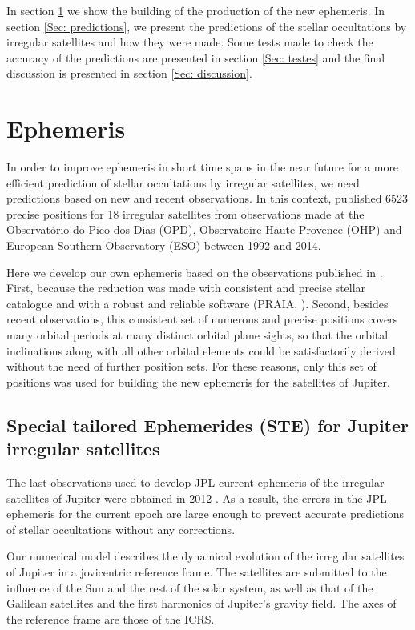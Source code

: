\documentclass[useAMS,usenatbib]{mn2e}
\begin{document}
In section \ref{Sec: integration} we show the building of the production of the new ephemeris. In section \ref{Sec: predictions}, we present the predictions of the stellar occultations by irregular satellites and how they were made. Some tests made to check the accuracy of the predictions are presented in section \ref{Sec: testes} and the final discussion is presented in section \ref{Sec: discussion}.

\section{Ephemeris} \label{Sec: integration}

In order to improve ephemeris in short time spans in the near future for a more efficient prediction of stellar occultations by irregular satellites, we need predictions based on new and recent observations. In this context, \cite{GomesJunior2015} published 6523 precise positions for 18 irregular satellites from observations made at the Observatório do Pico dos Dias (OPD), Observatoire Haute-Provence (OHP) and European Southern Observatory (ESO) between 1992 and 2014. 

Here we develop our own ephemeris based on the observations published in \cite{GomesJunior2015}. First, because the reduction was made with consistent and precise stellar catalogue and with a robust and reliable software (PRAIA, \cite{Assafin2011}). Second, besides recent observations, this consistent set of numerous and precise positions covers many orbital periods at many distinct orbital plane sights, so that the orbital inclinations along with all other orbital elements could be satisfactorily derived without the need of further position sets. For these reasons, only this set of positions was used for building the new ephemeris for the satellites of Jupiter.

\subsection{Special tailored Ephemerides (STE) for Jupiter irregular satellites}

The last observations used to develop JPL current ephemeris of the irregular satellites of Jupiter were obtained in 2012 \citep{Jacobson2012}. As a result, the errors in the JPL ephemeris for the current epoch are large enough to prevent accurate predictions of stellar occultations without any corrections.

Our numerical model describes the dynamical evolution of the irregular satellites of Jupiter in a jovicentric reference frame. The satellites are submitted to the influence of the Sun and the rest of the solar system, as well as that of the Galilean satellites and the first harmonics of Jupiter's gravity field. The axes of the reference frame are those of the ICRS. 
\end{document}
